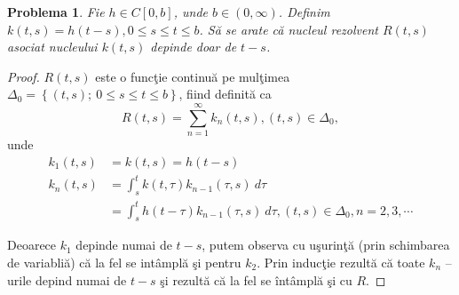 \documentclass[a4paper,12pt,oneside]{report}
\newtheorem{problem}{Problema}
\begin{document}
\begin{problem}  Fie \(h \in C\left [ 0,b \right ]\), unde \(b \in \left ( 0,\infty  \right )\). Definim \(k\left ( t,s \right ) = h\left ( t-s \right ), 0\leq s \leq  t\leq b\). S\u{a} se arate c\u{a} nucleul rezolvent \(R\left ( t,s \right )\) asociat nucleului \(k\left ( t,s \right )\) depinde doar de \(t-s\).
\end{problem}
\begin{proof}
\(R\left ( t,s \right )\) este o func\c{t}ie continu\u{a} pe mul\c{t}imea \(\Delta _{0} = \left \{ \left ( t,s \right );~0\leq s\leq t\leq b \right \}\), fiind definit\u{a} ca
\begin{displaymath}
  R\left ( t,s \right ) = \sum_{n = 1}^{\infty }k_{n}\left ( t,s \right ), \left ( t,s \right )\in \Delta _{0},
\end{displaymath}
unde
\begin{equation} \nonumber
    \begin{split}
        k_{1}\left ( t,s \right ) & = k\left ( t,s \right ) = h\left ( t-s \right ) \\
       k_{n}\left ( t,s \right ) & = \int_{s}^{t}k\left ( t,\tau  \right )k_{n-1}\left ( \tau ,s \right )\ d\tau \\ &
         = \int_{s}^{t} h\left ( t - \tau  \right )k_{n-1}\left ( \tau ,s \right ) \ d \tau , \left ( t,s \right ) \in \Delta _{0}, n = 2,3,\cdots
    \end{split}
\end{equation}

\noindent Deoarece \(k_{1}\) depinde numai de \(t-s\), putem observa cu u\c{s}urin\c{t}\u{a} (prin schimbarea de variabli\u{a}) c\u{a} la fel se int\^{a}mpl\u{a} \c{s}i pentru  \(k_{2}\). Prin induc\c{t}ie rezult\u{a} c\u{a} toate \(k_{n}\) – urile depind numai de \(t-s\)  \c{s}i rezult\u{a} c\u{a} la fel se \^{i}nt\^{a}mpl\u{a} \c{s}i cu \(R\).
\end{proof}
\end{document}
